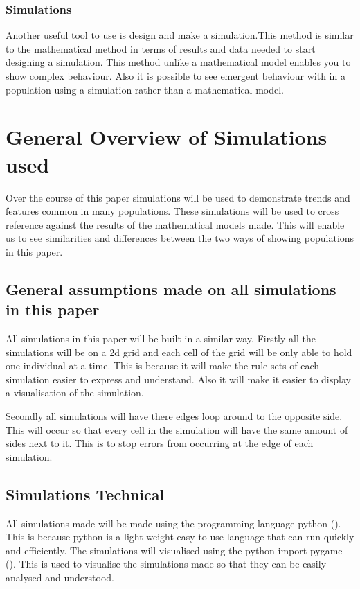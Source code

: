 \documentclass[final]{cmpreport}
\begin{document}
\subsubsection{Simulations}
Another useful tool to use is design and make a simulation.This method is similar to the mathematical method in terms of results and data needed to start designing a simulation. This method unlike a mathematical model enables you to show complex behaviour. Also it is possible to see emergent behaviour with in a population using a simulation rather than a mathematical model. 


\section{General Overview of Simulations used}
Over the course of this paper simulations will be used to demonstrate  trends and features common in many populations.  These simulations will be used to cross reference against the results of the mathematical models made. This will enable us to see similarities and differences between the two ways of showing populations in this paper.


\subsection{General assumptions made on all simulations in this paper}

All simulations in this paper will be built in a similar way. Firstly all the simulations will be on a 2d grid and each cell of the grid will be only able to hold one individual at a time. This is because it will make the rule sets of each simulation easier to express and understand. Also it will make it easier to display a visualisation of the simulation.

Secondly all simulations will have there edges loop around to the opposite side. This will occur so that every cell in the simulation will have the same amount of sides next to it. This is to stop errors from occurring at the edge of each simulation.

\subsection{Simulations Technical}

All simulations made will be made using the programming language python (\cite{python}). This is because python is a light weight easy to use language that can run quickly and efficiently. The simulations will visualised using the python import pygame (\cite{pygame}). This is used to visualise the simulations made so that they can be easily analysed and understood.
	
\end{document}
